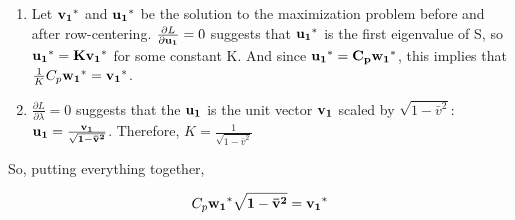 \documentclass[
]{article}
\providecommand{\tightlist}{%
  \setlength{\itemsep}{0pt}\setlength{\parskip}{0pt}}
\begin{document}
\begin{enumerate}
\def\labelenumi{\arabic{enumi}.}
\tightlist
\item
  Let \(\bf{v_1}^*\) and \(\bf{u_1}^*\) be the solution to the
  maximization problem before and after row-centering.
  \(\frac{\partial L}{\partial \bf{u_1}} = 0\) suggests that
  \(\bf{u_1}^*\) is the first eigenvalue of S, so
  \(\bf{u_1}^* = K \bf{v_1}^*\) for some constant K. And since
  \(\bf{u_1}^* = C_p \bf{w_1}^*\), this implies that
  \(\frac{1}{K} C_p \bf{w_1}^* = \bf{v_1}^*\).
\item
  \(\frac{\partial L}{\partial \lambda} = 0\) suggests that the
  \(\bf{u_1}\) is the unit vector \(\bf{v_1}\) scaled by
  \(\sqrt{1 - \bar{v}^2}\):
  \(\bf{u_1} = \frac{\bf{v_1}}{\sqrt{1 - \bar{v}^2}}\). Therefore,
  \(K = \frac{1}{\sqrt{1 - \bar{v}^2}}\)
\end{enumerate}

So, putting everything together,

\[
C_p \bf{w_1}^* \sqrt{1 - \bar{v}^2} = \bf{v_1}^*
\]
\end{document}
